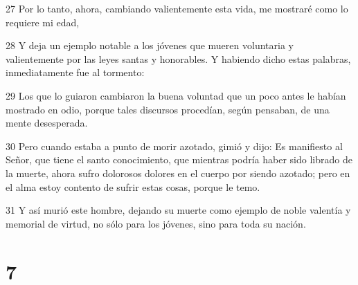 \par 27 Por lo tanto, ahora, cambiando valientemente esta vida, me mostraré como lo requiere mi edad,
\par 28 Y deja un ejemplo notable a los jóvenes que mueren voluntaria y valientemente por las leyes santas y honorables. Y habiendo dicho estas palabras, inmediatamente fue al tormento:
\par 29 Los que lo guiaron cambiaron la buena voluntad que un poco antes le habían mostrado en odio, porque tales discursos procedían, según pensaban, de una mente desesperada.
\par 30 Pero cuando estaba a punto de morir azotado, gimió y dijo: Es manifiesto al Señor, que tiene el santo conocimiento, que mientras podría haber sido librado de la muerte, ahora sufro dolorosos dolores en el cuerpo por siendo azotado; pero en el alma estoy contento de sufrir estas cosas, porque le temo.
\par 31 Y así murió este hombre, dejando su muerte como ejemplo de noble valentía y memorial de virtud, no sólo para los jóvenes, sino para toda su nación.

\chapter{7}

